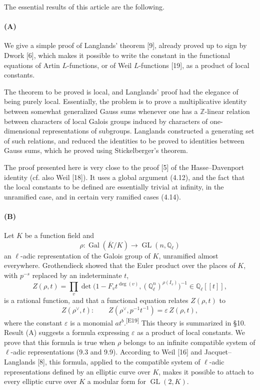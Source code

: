 \documentclass[10pt,letterpaper]{article}
\newcommand{\Q}{\mathbb Q}
\newcommand{\Z}{\mathbb Z}
\newcommand{\Gal}{\operatorname{Gal}}
\newcommand{\GL}{\operatorname{GL}}
\providecommand{\Gal}{\operatorname{Gal}}
\providecommand{\GL}{\operatorname{GL}}
\providecommand{\Gal}{\operatorname{Gal}}
\providecommand{\GL}{\operatorname{GL}}
\providecommand{\Gal}{\operatorname{Gal}}
\providecommand{\Gal}{\operatorname{Gal}}
\newcommand{\auditmark}[1]{\textsuperscript{\normalfont\scriptsize[E#1]}}
\begin{document}
The essential results of this article are the following.

\paragraph{(A)} We give a simple proof of Langlands' theorem [9], already proved up to sign by Dwork [6], which makes it possible to write the constant in the functional equations of Artin \(L\)-functions, or of Weil \(L\)-functions [19], as a product of local constants.

The theorem to be proved is local, and Langlands' proof had the elegance of being purely local. Essentially, the problem is to prove a multiplicative identity between somewhat generalized Gauss sums whenever one has a \(\Z\)-linear relation between characters of local Galois groups induced by characters of one-dimensional representations of subgroups. Langlands constructed a generating set of such relations, and reduced the identities to be proved to identities between Gauss sums, which he proved using Stickelberger's theorem.

The proof presented here is very close to the proof [5] of the Hasse--Davenport identity (cf. also Weil [18]). It uses a global argument (4.12), and the fact that the local constants to be defined are essentially trivial at infinity, in the unramified case, and in certain very ramified cases (4.14).

\paragraph{(B)} Let \(K\) be a function field and
\[
\rho:\Gal(\overline K/K)\longrightarrow \GL(n,\Q_\ell)
\]
an \(\ell\)-adic representation of the Galois group of \(K\), unramified almost everywhere. Grothendieck showed that the Euler product over the places of \(K\), with \(p^{-s}\) replaced by an indeterminate \(t\),
\[
Z(\rho,t)=\prod_v\det\bigl(1-F_vt^{\deg(v)},(\Q_\ell^n)^{\rho(I_v)}\bigr)^{-1}
\in\Q_\ell[[t]],
\]
is a rational function, and that a functional equation relates \(Z(\rho,t)\) to
\[
Z(\rho^\vee,t):
\qquad
Z(\rho^\vee,p^{-1}t^{-1})=\varepsilon\, Z(\rho,t),
\]
where the constant \(\varepsilon\) is a monomial \(at^b\).\auditmark{19} This theory is summarized in §10. Result (A) suggests a formula expressing \(\varepsilon\) as a product of local constants. We prove that this formula is true when \(\rho\) belongs to an infinite compatible system of \(\ell\)-adic representations (9.3 and 9.9). According to Weil [16] and Jacquet--Langlands [8], this formula, applied to the compatible system of \(\ell\)-adic representations defined by an elliptic curve over \(K\), makes it possible to attach to every elliptic curve over \(K\) a modular form for \(\GL(2,K)\).
\end{document}

